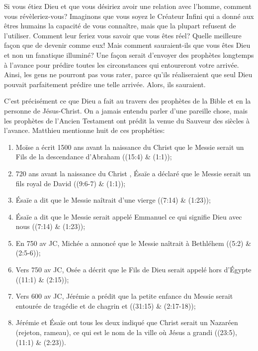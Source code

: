 

Si vous étiez Dieu et que vous désiriez avoir une relation avec l'homme, comment vous révèleriez-vous? Imaginons que vous soyez le Créateur Infini qui a donné aux êtres humains la capacité de vous connaître, mais que la plupart refusent de l'utiliser. Comment leur feriez vous savoir que vous êtes réel? Quelle meilleure façon que de devenir comme eux! Mais comment sauraient-ils que vous êtes Dieu et non un fanatique illuminé? Une façon serait d'envoyer des prophètes longtemps à l'avance pour prédire toutes les circonstances qui entoureront votre arrivée. Ainsi, les gens ne pourront pas vous rater, parce qu'ils réaliseraient que seul Dieu pouvait parfaitement prédire une telle arrivée. Alors, ils sauraient.

C'est précisément ce que Dieu a fait au travers des prophètes de la Bible et en la personne de Jésus-Christ. On a jamais entendu parler d'une pareille chose, mais les prophètes de l'Ancien Testament ont prédit la venue du Sauveur des siècles à l'avance. Matthieu mentionne huit de ces prophéties:

\begin{enumerate}
        \item Moïse a écrit 1500 ans avant la naissance du Christ que le Messie serait un Fils de la descendance d'Abraham ((15:4) \& (1:1));
        \item 720 ans avant la naissance du Christ , Ésaïe a déclaré que le Messie serait un fils royal de David ((9:6-7) \& (1:1));
        \item Ésaïe a dit que le Messie naîtrait d'une vierge ((7:14) \& (1:23));
        \item Ésaïe a dit que le Messie serait appelé Emmanuel ce qui signifie \og Dieu avec nous \fg{} ((7:14) \& (1:23));
        \item En 750 av JC, Michée a annoncé que le Messie naîtrait à Bethléhem ((5:2) \& (2:5-6));
        \item Vers 750 av JC, Osée a décrit que le Fils de Dieu serait appelé hors d'Égypte ((11:1) \& (2:15));
        \item Vers 600 av JC, Jérémie a prédit que la petite enfance du Messie serait entourée de tragédie et de chagrin et ((31:15) \& (2:17-18));
        \item Jérémie et Ésaïe ont tous les deux indiqué que Christ serait un Nazaréen (rejeton, rameau), ce qui est le nom de la ville où Jésus a grandi ((23:5), (11:1) \& (2:23)).
\end{enumerate}

